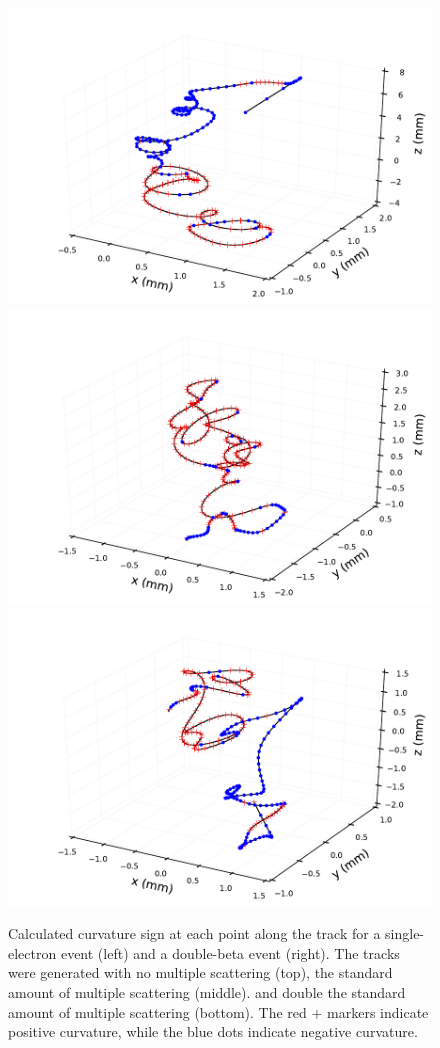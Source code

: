 \documentclass{JINST}
\begin{document}
\begin{figure}[!htb]
	\includegraphics[scale=0.48]{fig/plt_trkcurv_magbb05_ms13pt6_0.pdf}
	\includegraphics[scale=0.48]{fig/plt_trkcurv_magse05_ms27pt2_0.pdf}
	\includegraphics[scale=0.48]{fig/plt_trkcurv_magbb05_ms27pt2_1.pdf}
	\caption{\label{fig_trkcurv_cf}Calculated curvature sign at each point along the track for a single-electron event (left) and a double-beta event (right).  The tracks were generated with no multiple scattering (top), the 
	standard amount of multiple scattering (middle). and double the standard amount of multiple scattering 
	(bottom).  The red $+$ markers indicate positive curvature, while the blue dots indicate negative curvature.}
\end{figure}
\end{document}
